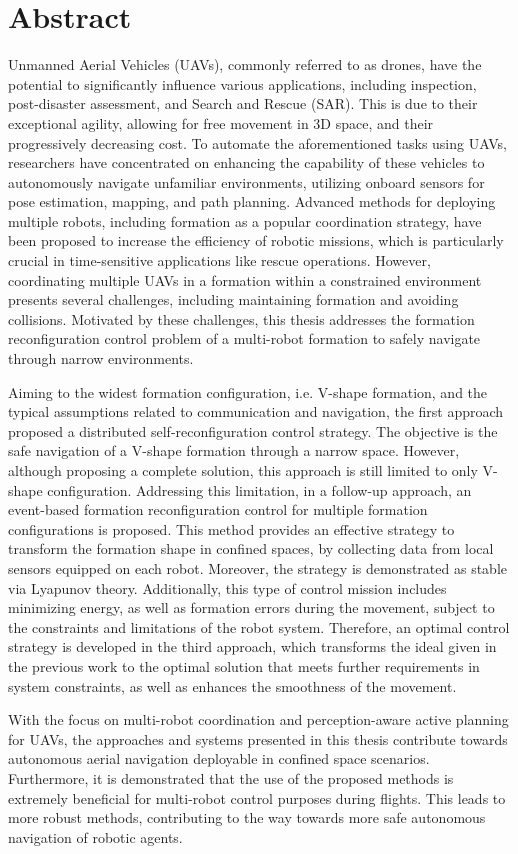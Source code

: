 \chapter*{Abstract}

Unmanned Aerial Vehicles (UAVs), commonly referred to as drones, have the potential to significantly influence various applications, including inspection, post-disaster assessment, and Search and Rescue (SAR). This is due to their exceptional agility, allowing for free movement in 3D space, and their progressively decreasing cost. To automate the aforementioned tasks using UAVs, researchers have concentrated on enhancing the capability of these vehicles to autonomously navigate unfamiliar environments, utilizing onboard sensors for pose estimation, mapping, and path planning. Advanced methods for deploying multiple robots, including formation as a popular coordination strategy, have been proposed to increase the efficiency of robotic missions, which is particularly crucial in time-sensitive applications like rescue operations. However, coordinating multiple UAVs in a formation within a constrained environment presents several challenges, including maintaining formation and avoiding collisions. Motivated by these challenges, this thesis addresses the formation reconfiguration control problem of a multi-robot formation to safely navigate through narrow environments.

Aiming to the widest formation configuration, i.e. V-shape formation, and the typical assumptions related to communication and navigation, the first approach proposed a distributed self-reconfiguration control strategy. The objective is the safe navigation of a V-shape formation through a narrow space. However, although proposing a complete solution, this approach is still limited to only V-shape configuration. Addressing this limitation, in a follow-up approach, an event-based formation reconfiguration control for multiple formation configurations is proposed. This method provides an effective strategy to transform the formation shape in confined spaces, by collecting data from local sensors equipped on each robot. Moreover, the strategy is demonstrated as stable via Lyapunov theory. Additionally, this type of control mission includes minimizing energy, as well as formation errors during the movement, subject to the constraints and limitations of the robot system. Therefore, an optimal control strategy is developed in the third approach, which transforms the ideal given in the previous work to the optimal solution that meets further requirements in system constraints, as well as enhances the smoothness of the movement.

With the focus on multi-robot coordination and perception-aware active planning for UAVs, the approaches and systems presented in this thesis contribute towards autonomous aerial navigation deployable in confined space scenarios. Furthermore, it is demonstrated that the use of the proposed methods is extremely beneficial for multi-robot control purposes during flights. This leads to more robust methods, contributing to the way towards more safe autonomous navigation of robotic agents.